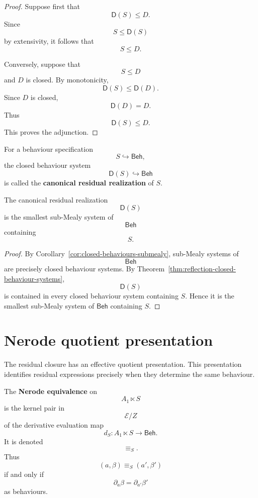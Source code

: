 \begin{proof}
Suppose first that
\[
\mathsf D(S)\leq D.
\]
Since
\[
S\leq \mathsf D(S)
\]
by extensivity, it follows that
\[
S\leq D.
\]

Conversely, suppose that
\[
S\leq D
\]
and \(D\) is closed. By monotonicity,
\[
\mathsf D(S)\leq\mathsf D(D).
\]
Since \(D\) is closed,
\[
\mathsf D(D)=D.
\]
Thus
\[
\mathsf D(S)\leq D.
\]
This proves the adjunction.
\end{proof}

\begin{definition}
\label{def:canonical-residual-realization}
For a behaviour specification
\[
S\hookrightarrow\mathsf{Beh},
\]
the closed behaviour system
\[
\mathsf D(S)\hookrightarrow\mathsf{Beh}
\]
is called the \textbf{canonical residual realization} of \(S\).
\end{definition}

\begin{proposition}[Minimality]
\label{prop:canonical-residual-realization-minimal}
The canonical residual realization
\[
\mathsf D(S)
\]
is the smallest sub-Mealy system of
\[
\mathsf{Beh}
\]
containing
\[
S.
\]
\end{proposition}

\begin{proof}
By Corollary~\ref{cor:closed-behaviours-submealy}, sub-Mealy systems of
\[
\mathsf{Beh}
\]
are precisely closed behaviour systems. By
Theorem~\ref{thm:reflection-closed-behaviour-systems},
\[
\mathsf D(S)
\]
is contained in every closed behaviour system containing \(S\). Hence it is
the smallest sub-Mealy system of \(\mathsf{Beh}\) containing \(S\).
\end{proof}

\section{Nerode quotient presentation}
\label{sec:nerode-quotient-presentation}

The residual closure has an effective quotient presentation. This
presentation identifies residual expressions precisely when they determine
the same behaviour.

\begin{definition}
\label{def:canonical-nerode-equivalence}
The \textbf{Nerode equivalence} on
\[
A_1\ltimes S
\]
is the kernel pair in
\[
\mathcal E/Z
\]
of the derivative evaluation map
\[
d_S:
A_1\ltimes S\to\mathsf{Beh}.
\]
It is denoted
\[
{\equiv_S}.
\]
Thus
\[
(a,\beta)\equiv_S(a',\beta')
\]
if and only if
\[
\partial_a\beta=\partial_{a'}\beta'
\]
as behaviours.
\end{definition}

